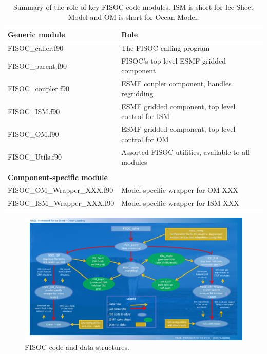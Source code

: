 \documentclass[11pt]{article}
\begin{document}
\begin{table}
  \begin{center}
    \begin{tabular}{ l|l }
      \textbf{Generic module} &  \textbf{Role}                              \\
      \hline
      FISOC\_caller.f90     &  The FISOC calling program \\
      FISOC\_parent.f90     &  FISOC's top level ESMF gridded component \\
      FISOC\_coupler.f90    &  ESMF coupler component, handles regridding \\
      FISOC\_ISM.f90        &  ESMF gridded component, top level control for ISM \\
      FISOC\_OM.f90         &  ESMF gridded component, top level control for OM  \\
      FISOC\_Utils.f90      &  Assorted FISOC utilities, available to all modules \\
      \\ 
      \textbf{Component-specific module} &                       \\
      \hline
      FISOC\_OM\_Wrapper\_XXX.f90  & Model-specific wrapper for OM XXX \\
      FISOC\_ISM\_Wrapper\_XXX.f90 & Model-specific wrapper for ISM XXX \\
    \end{tabular}
  \end{center}
  \caption{
    Summary of the role of key FISOC code modules.
    ISM is short for Ice Sheet Model and OM is short for Ocean Model.
  }
  \label{tab:modules}
\end{table}

\begin{figure}[t]
  \vspace*{2mm}
  \begin{center}
    \includegraphics[width=17cm]{FISOC_structure2.pdf}
  \end{center}
  \caption{FISOC code and data structures.}
  \label{fig:codeStruct}
\end{figure}
\end{document}
